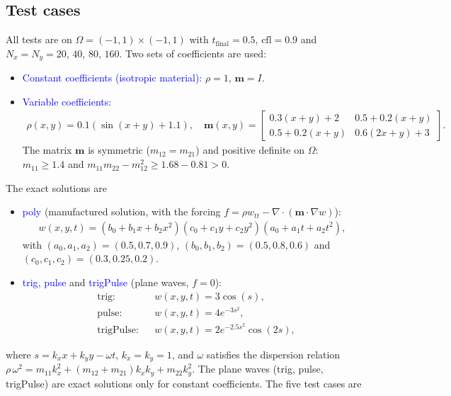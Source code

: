 \documentclass[11pt]{article}
\begin{document}
\subsection{Test cases}
All tests are on $\Omega=(-1,1)\times(-1,1)$ with $t_{\text{final}}=0.5$, $\mbox{cfl}=0.9$ and $N_x=N_y=20,\,40,\,80,\,160$. Two sets of coefficients are used:
\begin{itemize}
\item \textcolor{blue}{Constant coefficients (isotropic material):} $\rho=1$, $\bm{m}=I$.
\item \textcolor{blue}{Variable coefficients:}
\begin{align*}
\rho(x,y) = 0.1\left(\sin(x+y)+1.1\right), \quad
\bm{m}(x,y)=\begin{bmatrix}
	0.3(x+y)+2 & 0.5+0.2(x+y)\\
	0.5+0.2(x+y) & 0.6(2x+y)+3
\end{bmatrix}.
\end{align*}
The matrix $\bm{m}$ is symmetric ($m_{12}=m_{21}$) and positive definite on $\Omega$: $m_{11}\geq 1.4$ and $m_{11}m_{22}-m_{12}^2\geq 1.68-0.81>0$.
\end{itemize}
The exact solutions are
\begin{itemize}
\item \textcolor{blue}{poly} (manufactured solution, with the forcing $f=\rho w_{tt}-\nabla\cdot(\bm{m}\cdot\nabla w)$):
\begin{align*}
w(x,y,t)=(b_0+b_1x+b_2x^2)(c_0+c_1y+c_2y^2)(a_0+a_1t+a_2t^2),
\end{align*}
with $(a_0,a_1,a_2)=(0.5,0.7,0.9)$, $(b_0,b_1,b_2)=(0.5,0.8,0.6)$ and $(c_0,c_1,c_2)=(0.3,0.25,0.2)$.
\item \textcolor{blue}{trig}, \textcolor{blue}{pulse} and \textcolor{blue}{trigPulse} (plane waves, $f=0$):
\begin{align*}
&\text{trig:} && w(x,y,t)=3\cos(s),\\
&\text{pulse:} && w(x,y,t)=4e^{-3s^2},\\
&\text{trigPulse:} && w(x,y,t)=2e^{-2.5s^2}\cos(2s),
\end{align*}
\end{itemize}
where $s=k_xx+k_yy-\omega t$, $k_x=k_y=1$, and $\omega$ satisfies the dispersion relation $\rho\,\omega^2=m_{11}k_x^2+(m_{12}+m_{21})k_xk_y+m_{22}k_y^2$. The plane waves (trig, pulse, trigPulse) are exact solutions only for constant coefficients. The five test cases are
\end{document}

